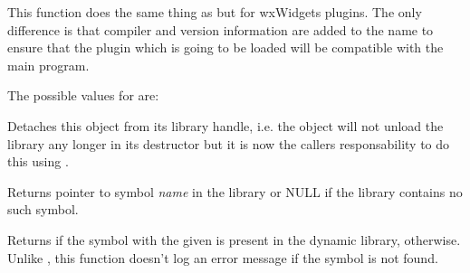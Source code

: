 


\label{wxdynamiclibrarycanonicalizepluginname}


This function does the same thing as 
 but for wxWidgets
plugins. The only difference is that compiler and version information are added
to the name to ensure that the plugin which is going to be loaded will be
compatible with the main program.

The possible values for  are:

\begin{twocollist}
\end{twocollist}


\label{wxdynamiclibrarydetach}


Detaches this object from its library handle, i.e. the object will not unload
the library any longer in its destructor but it is now the callers
responsability to do this using .


\label{wxdynamiclibrarygetsymbol}


Returns pointer to symbol {\it name} in the library or NULL if the library
contains no such symbol.




\label{wxdynamiclibraryhassymbol}


Returns \true if the symbol with the given  is present in the dynamic
library, \false otherwise. Unlike ,
this function doesn't log an error message if the symbol is not found.

